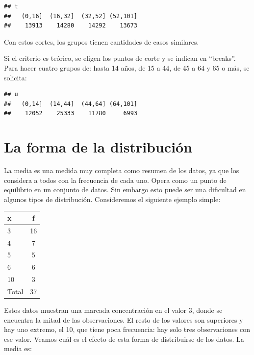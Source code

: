 \documentclass[]{book}
\newenvironment{Shaded}{\begin{snugshade}}{\end{snugshade}}
\newcommand{\DataTypeTok}[1]{\textcolor[rgb]{0.13,0.29,0.53}{#1}}
\newcommand{\DecValTok}[1]{\textcolor[rgb]{0.00,0.00,0.81}{#1}}
\newcommand{\FloatTok}[1]{\textcolor[rgb]{0.00,0.00,0.81}{#1}}
\newcommand{\KeywordTok}[1]{\textcolor[rgb]{0.13,0.29,0.53}{\textbf{#1}}}
\newcommand{\NormalTok}[1]{#1}
\newcommand{\OperatorTok}[1]{\textcolor[rgb]{0.81,0.36,0.00}{\textbf{#1}}}
\newcommand{\StringTok}[1]{\textcolor[rgb]{0.31,0.60,0.02}{#1}}
\begin{document}
\begin{verbatim}
## t
##   (0,16]  (16,32]  (32,52] (52,101] 
##    13913    14280    14292    13673
\end{verbatim}

Con estos cortes, los grupos tienen cantidades de casos similares.

Si el criterio es teórico, se eligen los puntos de corte y se indican en ``breaks''. Para hacer cuatro grupos de: hasta 14 años, de 15 a 44, de 45 a 64 y 65 o más, se solicita:

\begin{Shaded}
\end{Shaded}

\begin{verbatim}
## u
##   (0,14]  (14,44]  (44,64] (64,101] 
##    12052    25333    11780     6993
\end{verbatim}

\hypertarget{la-forma-de-la-distribuciuxf3n}{%
\section{La forma de la distribución}\label{la-forma-de-la-distribuciuxf3n}}

La media es una medida muy completa como resumen de los datos, ya que
los considera a todos con la frecuencia de cada uno. Opera como un punto
de equilibrio en un conjunto de datos. Sin embargo esto puede ser una
dificultad en algunos tipos de distribución. Consideremos el siguiente
ejemplo simple:

\begin{longtable}[]{@{}lc@{}}
\toprule
x & f\tabularnewline
\midrule
\endhead
3 & 16\tabularnewline
4 & 7\tabularnewline
5 & 5\tabularnewline
6 & 6\tabularnewline
10 & 3\tabularnewline
Total & 37\tabularnewline
\bottomrule
\end{longtable}

Estos datos muestran una marcada concentración en el valor 3, donde se
encuentra la mitad de las observaciones. El resto de los valores son
superiores y hay uno extremo, el 10, que tiene poca frecuencia: hay solo
tres observaciones con ese valor. Veamos cuál es el efecto de esta forma
de distribuirse de los datos. La media es:
\end{document}
